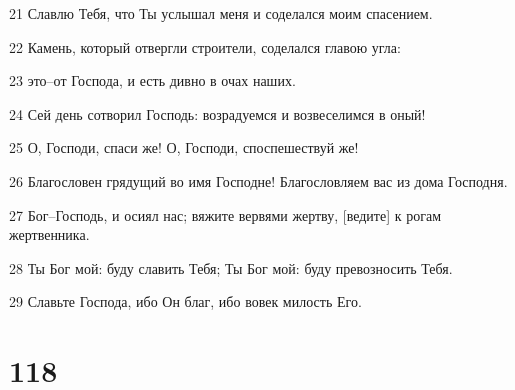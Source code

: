 \par 21 Славлю Тебя, что Ты услышал меня и соделался моим спасением.
\par 22 Камень, который отвергли строители, соделался главою угла:
\par 23 это--от Господа, и есть дивно в очах наших.
\par 24 Сей день сотворил Господь: возрадуемся и возвеселимся в оный!
\par 25 О, Господи, спаси же! О, Господи, споспешествуй же!
\par 26 Благословен грядущий во имя Господне! Благословляем вас из дома Господня.
\par 27 Бог--Господь, и осиял нас; вяжите вервями жертву, [ведите] к рогам жертвенника.
\par 28 Ты Бог мой: буду славить Тебя; Ты Бог мой: буду превозносить Тебя.
\par 29 Славьте Господа, ибо Он благ, ибо вовек милость Его.

\chapter{118}

